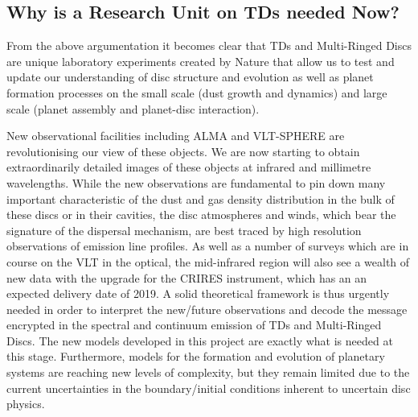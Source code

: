 \documentclass[10pt,fleqn,twoside]{article}
\begin{document}
\subsection{Why is a Research Unit on TDs needed Now?}
%
 From the above argumentation it becomes clear that TDs and Multi-Ringed
 Discs are
  unique laboratory experiments created by Nature that allow us to test and
  update our understanding of disc structure and evolution as well as planet
  formation processes on the small scale (dust growth and dynamics) and
  large scale (planet assembly and planet-disc interaction). 

New observational facilities including ALMA and VLT-SPHERE are revolutionising our view of
these objects. We are now starting to obtain extraordinarily detailed images of these objects at infrared and
millimetre wavelengths. While the new observations are fundamental to pin down many important
characteristic of the dust and gas density distribution in the bulk of
these discs or in their cavities, the disc atmospheres and winds, which bear the signature of the dispersal mechanism, are
best traced by high resolution observations of emission line profiles. As well as a number of surveys
which are in course on the VLT in the optical, the mid-infrared region will also see a wealth of new
data with the upgrade for the CRIRES instrument, which has an an expected delivery date of 2019.
A solid theoretical framework is thus urgently needed in order to interpret the new/future
observations and decode the message encrypted in the spectral and continuum emission of
TDs and Multi-Ringed Discs. The new models developed in this project are exactly what is needed at this stage.
Furthermore, models for the formation and evolution of planetary systems are reaching new
levels of complexity, but they remain limited due to the current uncertainties in the boundary/initial
conditions inherent to uncertain disc physics.
\end{document}
